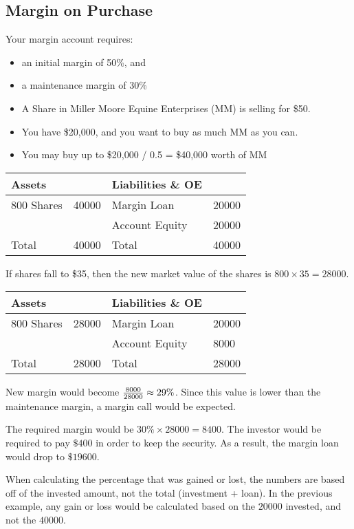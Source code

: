 \documentclass[english, 12pt]{article}
\begin{document}
\subsection{Margin on Purchase}
\begin{exmp}
Your margin account requires: 
\begin{itemize}
  \item an initial margin of 50\%, and
  \item a maintenance margin of 30\%
  \item A Share in Miller Moore Equine Enterprises (MM) is selling for \$50.
  \item You have \$20,000, and you want to buy as much MM as you can.
  \item You may buy up to \$20,000 / 0.5 = \$40,000 worth of MM
\end{itemize}
\begin{center}
\begin{tabular}{|ll|ll|}
\hline
Assets & & Liabilities \& OE & \\
\hline
800 Shares & 40000 & Margin Loan & 20000 \\
& & Account Equity & 20000 \\
\hline
Total & 40000 & Total & 40000\\
\hline
\end{tabular}
\end{center}
If shares fall to \$35, then the new market value of the shares is $800 \times 35 = 28000$.
\begin{center}
\begin{tabular}{|ll|ll|}
\hline
Assets & & Liabilities \& OE & \\
\hline
800 Shares & {\color{red}28000} & Margin Loan & 20000 \\
& & Account Equity & {\color{red} 8000} \\
\hline
Total & {\color{red} 28000} & Total & {\color{red} 28000}\\
\hline
\end{tabular}
\end{center}
New margin would become $\frac{8000}{28000} \approx 29\%$. Since this value is lower than the maintenance margin, a margin call would be expected.
\begin{note}
The required margin would be $30\% \times 28000 = 8400$. The investor would be required to pay $\$400$ in order to keep the security. As a result, the margin loan would drop to $\$19600$.
\end{note}
\end{exmp}
\begin{qte}
When calculating the percentage that was gained or lost, the numbers are based off of the invested amount, not the total (investment + loan). In the previous example, any gain or loss would be calculated based on the $20000$ invested, and not the $40000$.
\end{qte}
\end{document}
